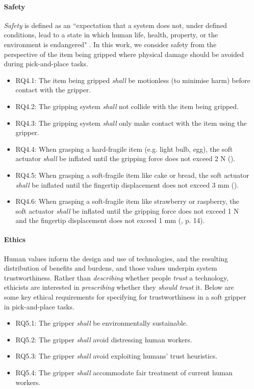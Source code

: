 \documentclass[letterpaper, 10 pt, conference]{ieeeconf}  %
\begin{document}
	\paragraph{\textbf{Safety}}\label{safety}
	\emph{Safety} is defined as an ``expectation that a system does not, under defined conditions, lead to a state in which human life, health, property, or the environment is endangered" \cite{ISO24765:2017}. 
	In this work, we consider safety from the perspective of the item being gripped where physical damage should be avoided during pick-and-place tasks. %
	\begin{itemize}[leftmargin=*]
		\item RQ4.1: The item being gripped \emph{shall} be motionless (to minimise harm) before contact with the gripper. 
		\item RQ4.2: The gripping system \emph{shall} not collide with the item being gripped. 
		\item RQ4.3: The gripping system \emph{shall} only make contact with the item using the gripper.
		\item RQ4.4: When grasping a hard-fragile item (e.g. light bulb, egg), the soft actuator \emph{shall} be inflated until the gripping force does not exceed 2 N (\cite{Cheng2021}).
		\item RQ4.5: When grasping a soft-fragile item like cake or bread, the soft actuator \emph{shall} be inflated until the fingertip displacement does not exceed 3 mm (\cite{Cheng2021}).
		\item RQ4.6: When grasping a soft-fragile item like strawberry or raspberry, the soft actuator \emph{shall} be inflated until the gripping force does not exceed 1 N and the fingertip displacement does not exceed 1 mm (\cite{Cheng2021}, p. 14).
	\end{itemize}
	
	\paragraph{\textbf{Ethics}}\label{ethics}
	Human values inform the design and use of technologies, and the resulting distribution of benefits and burdens, and those values underpin system trustworthiness. Rather than \emph{describing} whether people \emph{trust} a technology, ethicists are interested in \emph{prescribing} whether they \emph{should trust} it. Below are some key ethical requirements for specifying for trustworthiness in a soft gripper in pick-and-place tasks.
	\begin{itemize}[leftmargin=*]
		\item RQ5.1: The gripper \emph{shall} 
		be environmentally sustainable. 
		\item RQ5.2: The gripper \emph{shall} avoid distressing human workers.
		\item RQ5.3: The gripper \emph{shall} avoid exploiting humans' trust heuristics.
		\item RQ5.4: The gripper \emph{shall} accommodate fair treatment of current human workers.
	\end{itemize}
	
\end{document}
